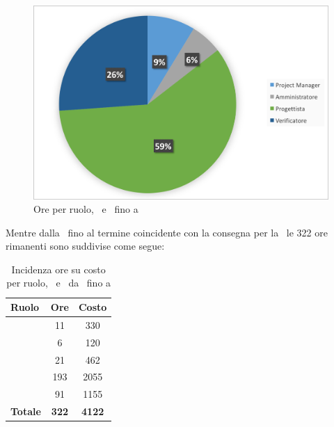 \begin{figure}[H]
	\centering 
	\includegraphics[scale=0.7]{Immagini/GraficiTorteSezione6/PD.png}
	\caption{Ore per ruolo, \PD\ e \COD\ fino a \RP}
\end{figure}

\newpage
Mentre dalla \RP\ fino al termine coincidente con la consegna per la \RQ\ le 322 ore rimanenti sono suddivise come segue:

\begin{table}[h]
	\begin{center}
		\begin{tabular}{|l|c|c|}
			\hline
			\textbf{Ruolo}	& \textbf{Ore} &	\textbf{Costo}	\\
			\hline
			\Pm &	11 & 330\\
			\hline
			\Am	&	6 & 120\\
			\hline
			\Prog	&	21 & 462\\
			\hline
			\Progr	&	193 & 2055\\
			\hline
			\Ver	&	91 & 1155\\
			\hline
			\textbf{Totale} &	 \textbf{322}	&	\textbf{4122}\\
			\hline
		\end{tabular}
	\end{center}
	\caption{Incidenza ore su costo per ruolo, \PD\ e \COD\ da \RP\ fino a \RQ}
\end{table}

